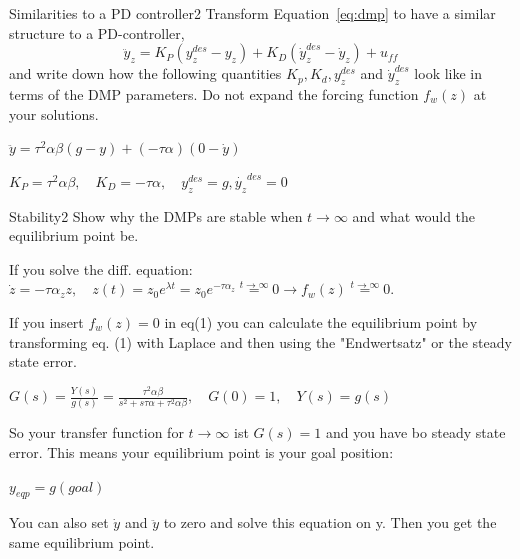 \begin{questions}


\begin{question}{Similarities to a PD controller}{2}
Transform Equation~\eqref{eq:dmp} to have a similar structure to a PD-controller,
%
\begin{equation}
    \ddot{y}_z = K_P ( y^{des}_z - y_z ) + K_D ( \dot{y}_z^{des} - \dot{y}_z ) +
    u_{ff}
\end{equation}
%
and write down how the following quantities $K_p, K_d, y^{des}_z$ and $\dot{y}_z^{des}$ look like in terms of the DMP parameters. Do not expand the forcing function $f_w(z)$ at your solutions.

\begin{answer}
	$\ddot{y}=\tau^2 \alpha \beta (g-y) + (-\tau \alpha) (0-\dot{y}) $	
	
	$K_P = \tau^2 \alpha \beta, \quad K_D= - \tau \alpha, \quad y_z^{des} = g , \dot{y_z}^{des}=0$
	\end{answer}

\end{question}


\begin{question}{Stability}{2}
Show why the DMPs are stable when $t\to\infty$ and what would the equilibrium point be.

\begin{answer}
	If you solve the diff. equation: $\dot{z}=-\tau\alpha_z z, \quad z(t)= z_0 e^{\lambda t}=z_0 e^{-\tau \alpha_z} \overset{t \rightarrow \infty}{=}0 \rightarrow f_w(z) \overset{t \rightarrow \infty}{=}0 $.
	
	If you insert $f_w(z)=0$ in eq(1) you can calculate the equilibrium point by transforming eq. (1) with Laplace and then using the "Endwertsatz" or the steady state error.
	
	$G(s)=\frac{Y(s)}{g(s)}= \frac{\tau^2 \alpha \beta}{s^2 + s \tau \alpha + \tau^2 \alpha \beta },\quad G(0) = 1,\quad Y(s)=g(s)$
	
	So your transfer function for $t \rightarrow \infty$ ist $G(s)=1$ and you have bo steady state error. This means your equilibrium point is your goal position: 
	
	$y_{eqp}=g (goal)$ 

	You can also set $\dot{y}$ and $\ddot{y}$ to zero and solve this equation on y. Then you get the same equilibrium point.
	\end{answer}


\end{question}
\end{questions}
